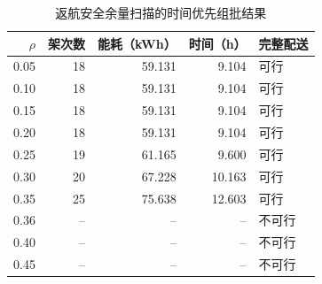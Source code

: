 \begin{table}[!htbp]
\centering
\caption{返航安全余量扫描的时间优先组批结果}
\label{tab:q1-sensitivity}
\small
\setlength{\tabcolsep}{4pt}
\renewcommand{\arraystretch}{1.10}
\begin{tabular}{@{}rrrrl@{}}
\toprule
$\rho$ & 架次数 & 能耗（kWh） & 时间（h） & 完整配送 \\
\midrule
0.05 & 18 & 59.131 & 9.104 & 可行 \\
0.10 & 18 & 59.131 & 9.104 & 可行 \\
0.15 & 18 & 59.131 & 9.104 & 可行 \\
0.20 & 18 & 59.131 & 9.104 & 可行 \\
0.25 & 19 & 61.165 & 9.600 & 可行 \\
0.30 & 20 & 67.228 & 10.163 & 可行 \\
0.35 & 25 & 75.638 & 12.603 & 可行 \\
0.36 & -- & -- & -- & 不可行 \\
0.40 & -- & -- & -- & 不可行 \\
0.45 & -- & -- & -- & 不可行 \\
\bottomrule
\end{tabular}
\par{}
\end{table}
